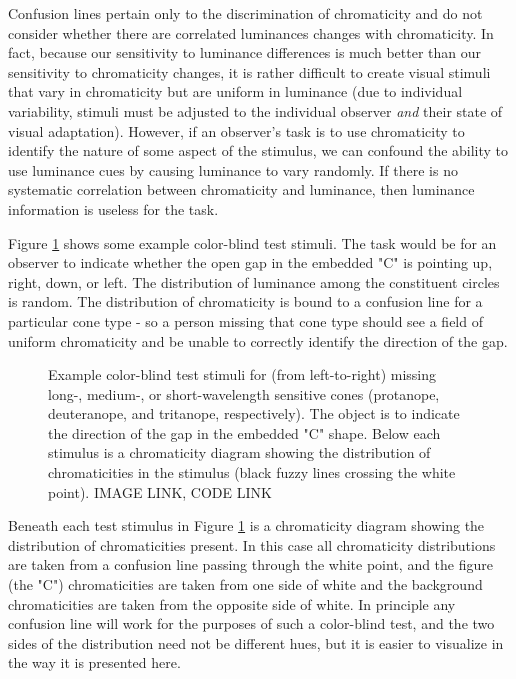 \documentclass{article}
\newif\ifinvert
\begin{document}
Confusion lines pertain only to the discrimination of chromaticity and do not consider whether there are correlated luminances changes with chromaticity.  In fact, because our sensitivity to luminance differences is much better than our sensitivity to chromaticity changes, it is rather difficult to create visual stimuli that vary in chromaticity but are uniform in luminance (due to individual variability, stimuli must be adjusted to the individual observer \textit{and} their state of visual adaptation).  However, if an observer's task is to use chromaticity to identify the nature of some aspect of the stimulus, we can confound the ability to use luminance cues by causing luminance to vary randomly.  If there is no systematic correlation between chromaticity and luminance, then luminance information is useless for the task.

Figure \ref{fig:color_blind_stimuli} shows some example color-blind test stimuli.  The task would be for an observer to indicate whether the open gap in the embedded "C" is pointing up, right, down, or left.  The distribution of luminance among the constituent circles is random.  The distribution of chromaticity is bound to a confusion line for a particular cone type - so a person missing that cone type should see a field of uniform chromaticity and be unable to correctly identify the direction of the gap.

\begin{figure} %
    \ifinvert
        
    \else
        
    \fi
    \caption{Example color-blind test stimuli for (from left-to-right) missing long-, medium-, or short-wavelength sensitive cones (protanope, deuteranope, and tritanope, respectively).  The object is to indicate the direction of the gap in the embedded "C" shape.  Below each stimulus is a chromaticity diagram showing the distribution of chromaticities in the stimulus (black fuzzy lines crossing the white point).  IMAGE LINK, CODE LINK}\label{fig:color_blind_stimuli}
\end{figure}

Beneath each test stimulus in Figure \ref{fig:color_blind_stimuli} is a chromaticity diagram showing the distribution of chromaticities present.  In this case all chromaticity distributions are taken from a confusion line passing through the white point, and the figure (the "C") chromaticities are taken from one side of white and the background chromaticities are taken from the opposite side of white.  In principle any confusion line will work for the purposes of such a color-blind test, and the two sides of the distribution need not be different hues, but it is easier to visualize in the way it is presented here.
\end{document}
